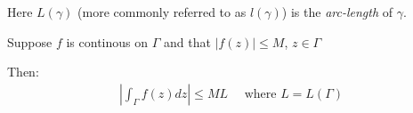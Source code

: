 \noindent Here $L(\gamma)$ (more commonly referred to as $l(\gamma)$) is the \textit{arc-length} of $\gamma$.
\par\bigskip
\begin{theo}[]{}
  Suppose $f$ is continous on $\Gamma$ and that $\left|f(z)\right|\leq M$, $z\in\Gamma$\par
  \noindent Then:
  \begin{equation*}
    \begin{gathered}
      \left|\int_{\Gamma}f(z)dz\right|\leq ML\quad\text{ where } L = L(\Gamma)
    \end{gathered}
  \end{equation*}
\end{theo}
